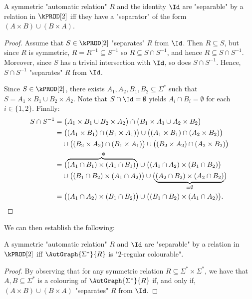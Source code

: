 \begin{lemma}
    A symmetric "automatic relation" $R$ and the identity $\Id$ are "separable" by a relation in $\kPROD[2]$ iff they have a "separator" of the form $(A \times B) \cup (B \times A)$.
\end{lemma}
\begin{proof}
    Assume that $S \in \kPROD[2]$ "separates" $R$ from $\Id$.
    Then $R \subseteq S$, but since $R$ is symmetric, $R = R^{-1} \subseteq S^{-1}$ so
    $R \subseteq S \cap S^{-1}$, and hence $R \subseteq S \cap S^{-1}$.
    Moreover, since $S$ has a trivial intersection with $\Id$, so does $S \cap S^{-1}$.
    Hence, $S \cap S^{-1}$ "separates" $R$ from $\Id$.

    Since $S \in \kPROD[2]$, there exists $A_1,A_2,B_1,B_2 \subseteq \Sigma^*$ such that
    $S = A_1 \times B_1 \cup B_2 \times A_2$.
    Note that $S \cap \Id = \emptyset$ yields $A_i \cap B_i = \emptyset$ for each $i \in \{1,2\}$.
    Finally:
    \begin{align*}
        S \cap S^{-1} &
        =
            \bigl( A_1 \times B_1 \cup B_2 \times A_2 \bigr)
            \cap \bigl( B_1 \times A_1 \cup A_2 \times B_2 \bigr) \\
        &
        =
            \bigl( (A_1 \times B_1) \cap (B_1 \times A_1) \bigr)
            \cup \bigl( (A_1 \times B_1) \cap (A_2 \times B_2) \bigr) \\
        &
        \hphantom{=\;} \cup \bigl( (B_2 \times A_2) \cap (B_1 \times A_1) \bigr)
            \cup \bigl( (B_2 \times A_2) \cap (A_2 \times B_2) \bigr) \\
        &
        =
            \bigl( \overbrace{(A_1 \cap B_1) \times (A_1 \cap B_1)}^{= \emptyset} \bigr)
            \cup \bigl( (A_1 \cap A_2) \times (B_1 \cap B_2) \bigr) \\
        &
        \hphantom{=\;} \cup \bigl( (B_1 \cap B_2) \times (A_1 \cap A_2) \bigr)
            \cup \bigl( \underbrace{(A_2 \cap B_2) \times (A_2 \cap B_2)}_{= \emptyset} \bigr)\\
        &
        = \bigl( (A_1 \cap A_2) \times (B_1 \cap B_2) \bigr)
            \cup \bigl( (B_1 \cap B_2) \times (A_1 \cap A_2) \bigr).\qedhere
    \end{align*}
\end{proof}

We can then establish the following: 

\begin{corollary}\AP\label{cor:2reg-2prod}
    A symmetric "automatic relation" $R$ and $\Id$ are "separable" by a relation in $\kPROD[2]$ if{f} $\AutGraph{\Sigma^*}{R}$ is "$2$-regular colourable".
\end{corollary}
\begin{proof}
    By observing that for any symmetric relation $R \subseteq \Sigma^* \times \Sigma^*$, we have that $A,B \subseteq \Sigma^*$ is a colouring of $\AutGraph{\Sigma^*}{R}$ if, and only if, $(A \times B) \cup (B \times A)$ "separates" $R$ from $\Id$.
\end{proof}

